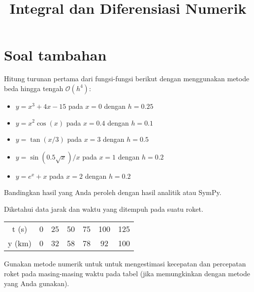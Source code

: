 



\title{Integral dan Diferensiasi Numerik}
\author{}
\date{}
\maketitle








\section{Soal tambahan}







\begin{soal}
Hitung turunan pertama dari fungsi-fungsi berikut dengan menggunakan metode beda hingga
tengah $\mathcal{O}(h^4)$:
\begin{itemize}
\item $y = x^3 + 4x - 15$ pada $x=0$ dengan $h=0.25$
\item $y = x^2 \cos(x)$ pada $x=0.4$ dengan $h=0.1$
\item $y = \tan(x/3)$ pada $x=3$ dengan $h=0.5$
\item $y = \sin(0.5\sqrt{x})/x$ pada $x=1$ dengan $h=0.2$
\item $y = e^{x} + x$ pada $x=2$ dengan $h=0.2$
\end{itemize}
Bandingkan hasil yang Anda peroleh dengan hasil analitik atau SymPy.
\end{soal}


\begin{soal}
Diketahui data jarak dan waktu yang ditempuh pada suatu roket.

{\centering
\begin{tabular}{|c|cccccc|}
\hline
t (s)  & 0 & 25 & 50 & 75 & 100 & 125 \\
y (km) & 0 & 32 & 58 & 78 &  92 & 100 \\
\hline
\end{tabular}
\par}

Gunakan metode numerik untuk untuk mengestimasi kecepatan dan percepatan roket
pada masing-masing waktu pada tabel (jika memungkinkan dengan metode yang Anda
gunakan).
\end{soal}





